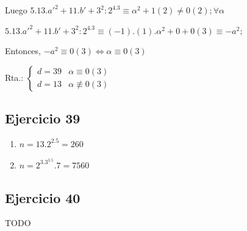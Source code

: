 Luego $ 5.13.a'^2 + 11.b'+3^2:2^4.3 \equiv \alpha^2 + 1 (2) \neq 0(2); \forall \alpha $

$ 5.13.a'^2 + 11.b'+3^2:2^4.3 \equiv (-1).(1).\alpha^2 + 0 + 0 (3) \equiv -a^2;$

Entonces, $ -a^2 \equiv 0(3) \iff \alpha \equiv 0 (3) $

Rta.: $ \begin{cases}
    d = 39 & \alpha \equiv 0(3) \\
    d = 13 & \alpha \not \equiv 0(3)
\end{cases}$

\subsection{Ejercicio 39}
\begin{enumerate}
    \item $ n = 13.2^2.5 = 260 $
    \item $ n = 2^3.3^3.5.7 = 7560 $
\end{enumerate}

\subsection{Ejercicio 40}
TODO


